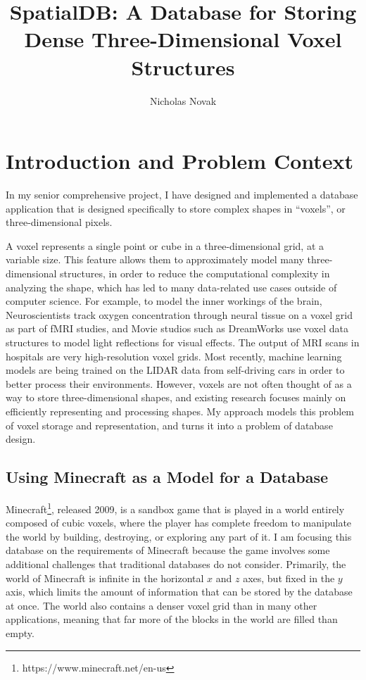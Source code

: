 \documentclass[10pt,twocolumn]{article}
\title{SpatialDB: A Database for Storing Dense Three-Dimensional Voxel Structures}
\author{Nicholas Novak}
\affiliation{Occidental College}
\begin{document}
\maketitle

\section{Introduction and Problem Context}

In my senior comprehensive project, I have designed and implemented a database
application that is designed specifically to store complex shapes in ``voxels'',
or three-dimensional pixels.

A voxel\cite{enwiki:1186283262} represents a single point or cube in a
three-dimensional grid, at a variable size. This feature allows them to
approximately model many three-dimensional structures, in order to reduce the
computational complexity in analyzing the shape, which has led to many
data-related use cases outside of computer science. For example, to model the
inner workings of the brain, Neuroscientists track oxygen concentration through
neural tissue on a voxel grid as part of fMRI studies\cite{norman2006beyond},
and Movie studios such as DreamWorks use voxel data structures to model light
reflections for visual effects\cite{museth2013vdb}. The output of MRI scans in
hospitals are very high-resolution voxel grids. Most recently, machine learning
models are being trained on the LIDAR data from self-driving
cars\cite{li2020deep} in order to better process their environments. However,
voxels are not often thought of as a way to store three-dimensional shapes, and
existing research focuses mainly on efficiently representing and processing
shapes. My approach models this problem of voxel storage and representation, and
turns it into a problem of database design.

\subsection{Using Minecraft as a Model for a Database}

Minecraft\footnote{https://www.minecraft.net/en-us}, released 2009, is a sandbox
game that is played in a world entirely composed of cubic voxels, where the
player has complete freedom to manipulate the world by building, destroying, or
exploring any part of it. I am focusing this database on the requirements of
Minecraft because the game involves some additional challenges that traditional
databases do not consider. Primarily, the world of Minecraft is infinite in the
horizontal $x$ and $z$ axes, but fixed in the $y$ axis, which limits the amount
of information that can be stored by the database at once. The world also
contains a denser voxel grid than in many other applications, meaning that far
more of the blocks in the world are filled than empty.
\end{document}

